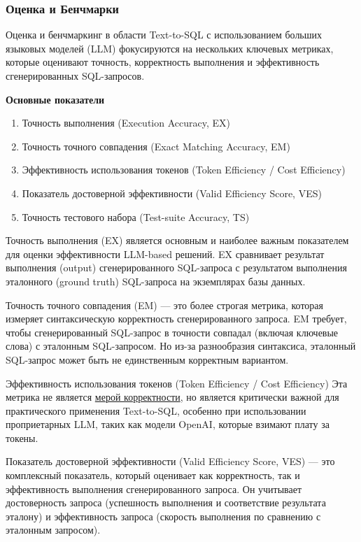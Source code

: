 \subsubsection{Оценка и Бенчмарки}

Оценка и бенчмаркинг в области Text-to-SQL с использованием больших языковых моделей (LLM) фокусируются на нескольких ключевых метриках, которые оценивают точность, корректность выполнения и эффективность сгенерированных SQL-запросов.

\textbf{Основные показатели}

\begin{enumerate}
    \item Точность выполнения (Execution Accuracy, EX)
    \item Точность точного совпадения (Exact Matching Accuracy, EM)
    \item Эффективность использования токенов (Token Efficiency / Cost Efficiency)
    \item Показатель достоверной эффективности (Valid Efficiency Score, VES)
    \item Точность тестового набора (Test-suite Accuracy, TS)
\end{enumerate}


Точность выполнения (EX) является основным и наиболее важным показателем для оценки эффективности LLM-based решений. EX сравнивает результат выполнения (output) сгенерированного SQL-запроса с результатом выполнения эталонного (ground truth) SQL-запроса на экземплярах базы данных.

Точность точного совпадения (EM) — это более строгая метрика, которая измеряет синтаксическую корректность сгенерированного запроса. EM требует, чтобы сгенерированный SQL-запрос в точности совпадал (включая ключевые слова) с эталонным SQL-запросом. Но из-за разнообразия синтаксиса, эталонный SQL-запрос может быть не единственным корректным вариантом.

Эффективность использования токенов (Token Efficiency / Cost Efficiency) Эта метрика не является \underline{мерой корректности}, но является критически важной для практического применения Text-to-SQL, особенно при использовании проприетарных LLM, таких как модели OpenAI, которые взимают плату за токены.

Показатель достоверной эффективности (Valid Efficiency Score, VES) — это комплексный показатель, который оценивает как корректность, так и эффективность выполнения сгенерированного запроса. Он учитывает достоверность запроса (успешность выполнения и соответствие результата эталону) и эффективность запроса (скорость выполнения по сравнению с эталонным запросом).

